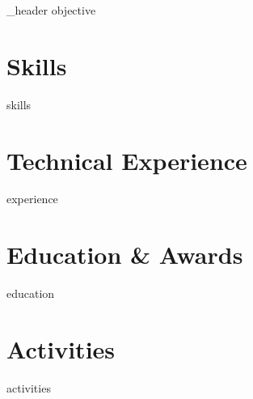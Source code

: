 \documentclass[letter,10pt]{article}
\author{Timmy L. Chan} %
\begin{document}
{_header} 
{objective}

\section{Skills}
{skills}

\section{Technical Experience}
{experience}

\section{Education \& Awards}
{education}

\newpage
\section{Activities}
{activities}
\end{document}
